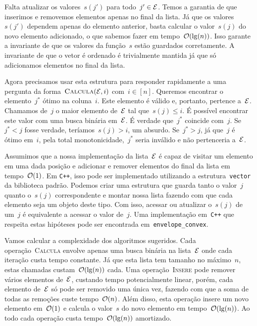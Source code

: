 Falta atualizar os valores~$s(j')$ para todo~$j' \in \mathcal{E}$. Temos a garantia de que inserimos e removemos elementos apenas no final da lista. Já que os valores~$s(j')$ dependem apenas do elemento anterior, basta calcular o valor~$s(j)$ do novo elemento adicionado, o que sabemos fazer em tempo~$\mathcal{O}(\lg(n))$. Isso garante a invariante de que os valores da função~$s$ estão guardados corretamente. A invariante de que o vetor é ordenado é trivialmente mantida já que só adicionamos elementos no final da lista.

Agora precisamos usar esta estrutura para responder rapidamente a uma pergunta da forma~${ \textsc{Calcula}(\mathcal{E},i) }$ com~$i \in [n]$. Queremos encontrar o elemento~$j^*$ ótimo na coluna~$i$. Este elemento é válido e, portanto, pertence a~$\mathcal{E}$. Chamamos de~$j$ o maior elemento de~$\mathcal{E}$ tal que~$s(j) \leq i$. É possível encontrar este valor com uma busca binária em~$\mathcal{E}$. É verdade que~$j^*$ coincide com~$j$. Se~${ j^* < j }$ fosse verdade, teríamos~${ s(j) > i }$, um absurdo. Se~${ j^* > j }$, já que~$j$ é ótimo em~$i$, pela total monotonicidade,~$j^*$ seria inválido e não pertenceria a~$\mathcal{E}$.

Assumimos que a nossa implementação da lista~$\mathcal{E}$ é capaz de visitar um elemento em uma dada posição e adicionar e remover elementos do final da lista em tempo~$\mathcal{O}(1)$. Em \texttt{C++}, isso pode ser implementado utilizando a estrutura~\texttt{vector} da biblioteca padrão. Podemos criar uma estrutura que guarda tanto o valor~$j$ quanto o~$s(j)$ correspondente e montar nossa lista fazendo com que cada elemento seja um objeto deste tipo. Com isso, acessar ou atualizar o~$s(j)$ de um~$j$ é equivalente a acessar o valor de~$j$. Uma implementação em~\texttt{C++} que respeita estas hipóteses pode ser encontrada em~\texttt{envelope\_convex}.

Vamos calcular a complexidade dos algoritmos sugeridos. Cada operação~\textsc{Calcula} envolve apenas uma busca binária na lista~$\mathcal{E}$ onde cada iteração custa tempo constante. Já que esta lista tem tamanho no máximo~$n$, estas chamadas custam~$\mathcal{O}(\lg(n))$ cada. Uma operação~\textsc{Insere} pode remover vários elementos de~$\mathcal{E}$, custando tempo potencialmente linear, porém, cada elemento de~$\mathcal{E}$ só pode ser removido uma única vez, fazendo com que a soma de todas as remoções custe tempo~$\mathcal{O}(n)$. Além disso, esta operação insere um novo elemento em~$\mathcal{O}(1)$ e calcula o valor~$s$ do novo elemento em tempo~$\mathcal{O}(\lg(n))$. Ao todo cada operação custa tempo~$\mathcal{O}(\lg(n))$ amortizado.

